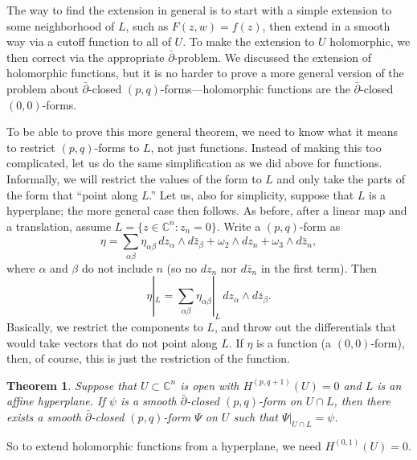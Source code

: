 \documentclass[12pt,openany]{book}
\newcommand{\C}{{\mathbb{C}}}
\theoremstyle{plain}
\newtheorem{thm}{Theorem}[section]
\theoremstyle{remark}
\theoremstyle{definition}
\theoremstyle{exercise}
\theoremstyle{example}
\begin{document}
The way to find the extension in general is to start with a simple
extension to some neighborhood of $L$, such as $F(z,w)=f(z)$,
then extend in a smooth way via a cutoff function to all of $U$.
To make the extension to $U$ holomorphic, we
then correct via the appropriate $\bar{\partial}$-problem.
We discussed the extension of holomorphic functions, but it is no harder to
prove a more general version of the problem about
$\bar{\partial}$-closed $(p,q)$-forms---holomorphic functions
are the $\bar{\partial}$-closed $(0,0)$-forms.

To be able to prove this more general theorem, we need to know what it means
to restrict $(p,q)$-forms to $L$, not just functions.
Instead of making this too complicated, let us do the same
simplification as we did above for functions.
Informally, we will restrict the values of the form
to $L$ and only take the parts of the form that ``point along $L$.''
Let us, also for simplicity, suppose that $L$ is a hyperplane; the more
general case then follows.
As before,
after a linear map and a translation, assume $L = \{ z \in \C^n : z_n = 0 \}$.
Write a $(p,q)$-form as
\begin{equation*}
\eta = \sum_{\alpha\beta} \eta_{\alpha\beta} \, dz_{\alpha} \wedge d\bar{z}_{\beta}
+ \omega_2 \wedge dz_n + \omega_3 \wedge d\bar{z}_n ,
\end{equation*}
where $\alpha$ and $\beta$ do not include $n$ (so no $dz_n$ nor $d\bar{z}_n$
in the first term).  Then
\begin{equation*}
\eta|_L = \sum_{\alpha\beta} \eta_{\alpha\beta}|_L \, dz_{\alpha} \wedge
d\bar{z}_{\beta} .
\end{equation*}
Basically, we restrict the components to $L$, and throw out the differentials
that would take vectors that do not point along $L$.
If $\eta$ is a function (a $(0,0)$-form),
then, of course, this
is just the restriction of the function.

\begin{thm}
Suppose that $U \subset \C^n$ is open with $H^{(p,q+1)}(U) = 0$ and
$L$ is an affine hyperplane.
If $\psi$ is a smooth $\bar{\partial}$-closed $(p,q)$-form on
$U \cap L$, then there exists a smooth $\bar{\partial}$-closed $(p,q)$-form
$\Psi$ on $U$ such that $\Psi|_{U \cap L} = \psi$.
\end{thm}

So to extend holomorphic functions from a hyperplane,
we need $H^{(0,1)}(U) = 0$.
\end{document}
